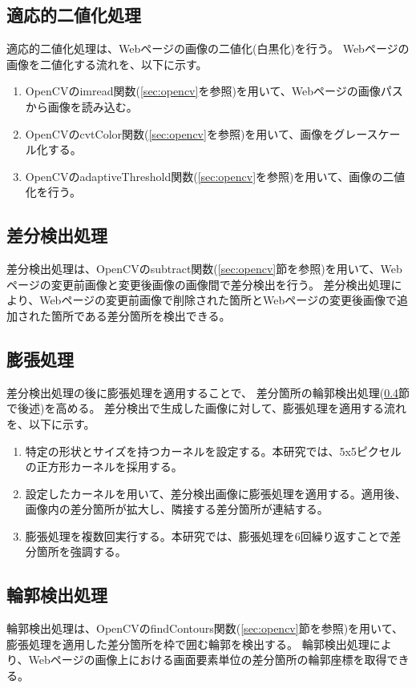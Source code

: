 \subsection{適応的二値化処理}\label{subsec:Adaptive_Binarisation}
適応的二値化処理は、Webページの画像の二値化(白黒化)を行う。
Webページの画像を二値化する流れを、以下に示す。
\begin{enumerate}
    \item OpenCVのimread関数(\ref{sec:opencv}を参照)を用いて、Webページの画像パスから画像を読み込む。
    \item OpenCVのcvtColor関数(\ref{sec:opencv}を参照)を用いて、画像をグレースケール化する。
    \item OpenCVのadaptiveThreshold関数(\ref{sec:opencv}を参照)を用いて、画像の二値化を行う。
\end{enumerate}

\subsection{差分検出処理}\label{subsec:difference_detection_process}
差分検出処理は、OpenCVのsubtract関数(\ref{sec:opencv}節を参照)を用いて、Webページの変更前画像と変更後画像の画像間で差分検出を行う。
差分検出処理により、Webページの変更前画像で削除された箇所とWebページの変更後画像で追加された箇所である差分箇所を検出できる。

\subsection{膨張処理}\label{subsec:dilation}
差分検出処理の後に膨張処理を適用することで、
差分箇所の輪郭検出処理(\ref{subsec:contour_detection_processing}節で後述)を高める。
差分検出で生成した画像に対して、膨張処理を適用する流れを、以下に示す。
\begin{enumerate}
    \item 特定の形状とサイズを持つカーネルを設定する。本研究では、5x5ピクセルの正方形カーネルを採用する。
    \item 設定したカーネルを用いて、差分検出画像に膨張処理を適用する。適用後、画像内の差分箇所が拡大し、隣接する差分箇所が連結する。
    \item 膨張処理を複数回実行する。本研究では、膨張処理を6回繰り返すことで差分箇所を強調する。
\end{enumerate}

\subsection{輪郭検出処理}\label{subsec:contour_detection_processing}
輪郭検出処理は、OpenCVのfindContours関数(\ref{sec:opencv}節を参照)を用いて、膨張処理を適用した差分箇所を枠で囲む輪郭を検出する。
輪郭検出処理により、Webページの画像上における画面要素単位の差分箇所の輪郭座標を取得できる。

